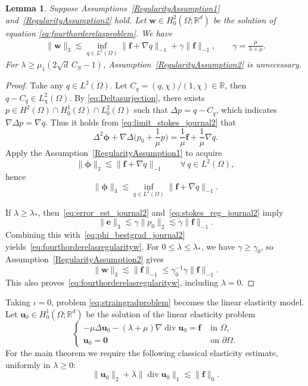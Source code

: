 \documentclass[10pt]{amsart}
\newtheorem{lemma}[theorem]{Lemma}
\renewcommand{\div}{\operatorname{div}}
\numberwithin{equation}{section}
\begin{document}
\begin{lemma}\label{lm:fourthorderelasbestgradient}
Suppose Assumptions~\ref{RegularityAssumption1} and~\ref{RegularityAssumption2} hold.
Let $\boldsymbol w\in H_0^2(\Omega; \mathbb R^d)$ be the solution of equation \eqref{eq:fourthorderelasproblem}.
We have
\begin{align}
\label{eq:fourthorderelasregularityw}
\|\boldsymbol w\|_{3}\lesssim \inf_{q\in L^2(\Omega)}\|\boldsymbol f+\nabla q\|_{-1} + \gamma\|\boldsymbol f\|_{-1},\qquad\gamma=\frac{\mu}{\lambda+\mu}.
\end{align}
For $\lambda\geq\mu_1(2\sqrt d\,C_S-1)$, Assumption~\ref{RegularityAssumption2} is unnecessary.
\end{lemma}
\begin{proof}
Take any $q\in L^2(\Omega)$. Let $C_q=(q,\chi)/(1,\chi)\in\mathbb R$, then $q-C_q\in L^2_\chi(\Omega)$. By \eqref{eq:Deltasurjection}, there exists $p\in H^2(\Omega)\cap H_0^1(\Omega)\cap L_0^2(\Omega)$ such that $\Delta p=q-C_q$, which indicates $\nabla\Delta p=\nabla q$.
Thus it holds from \eqref{eq:limit_stokes_journal2} that
\[
\Delta^2\boldsymbol\phi+\nabla\Delta\Big(p_0+\frac{1}{\mu}p\Big)
=\frac{1}{\mu}\boldsymbol f+\frac{1}{\mu}\nabla q.
\]
Apply the Assumption~\ref{RegularityAssumption1} to acquire
\[
\|\boldsymbol\phi\|_3\lesssim \|\boldsymbol f+\nabla q\|_{-1}\qquad\forall\,q\in L^2(\Omega),
\]
hence
\begin{equation}\label{eq:phi_bestgrad_journal2}
\|\boldsymbol\phi\|_3\lesssim \inf_{q\in L^2(\Omega)}\|\boldsymbol f+\nabla q\|_{-1}.
\end{equation}

If $\lambda\ge\lambda_\ast$, then~\eqref{eq:error_est_journal2} and~\eqref{eq:stokes_reg_journal2} imply
\[
\|\boldsymbol e\|_3\lesssim\gamma\|p_0\|_2\lesssim\gamma\|\boldsymbol f\|_{-1}.
\]
Combining this with~\eqref{eq:phi_bestgrad_journal2} yields~\eqref{eq:fourthorderelasregularityw}.
For $0\le\lambda\le\lambda_\ast$, we have $\gamma\ge\gamma_0$, so Assumption~\ref{RegularityAssumption2} gives
\[
\|\boldsymbol w\|_3\lesssim\|\boldsymbol f\|_{-1}\le\gamma_0^{-1}\gamma\|\boldsymbol f\|_{-1}.
\]
This also proves~\eqref{eq:fourthorderelasregularityw}, including $\lambda=0$.
\end{proof}

Taking $\iota=0$, problem \eqref{eq:straingradproblem} becomes the linear elasticity model. Let $\boldsymbol u_0\in H_0^1(\Omega; \mathbb R^d)$ be the solution of the linear elasticity problem
\begin{equation}\label{eq:elasticity}
\begin{cases}
-\mu\Delta\boldsymbol u_0 - (\lambda+\mu)\nabla\div\boldsymbol u_0 =\boldsymbol f & \textrm{ in } \Omega,\\
\boldsymbol u_0=\boldsymbol0 & \textrm{ on } \partial\Omega.
\end{cases}
\end{equation}
For the main theorem we require the following classical elasticity estimate, uniformly in $\lambda\geq0$:
\begin{equation}\label{eq:u0regularity}
\|\boldsymbol u_0\|_2+\lambda\|\div\boldsymbol u_0\|_1 \lesssim \|\boldsymbol f\|_0.
\end{equation}
\end{document}

